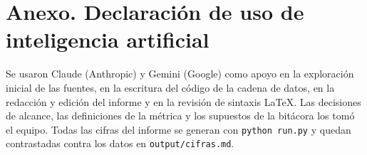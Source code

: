 
\section*{Anexo. Declaración de uso de inteligencia artificial}

Se usaron Claude (Anthropic) y Gemini (Google) como apoyo en la exploración inicial de las fuentes, en la escritura del código de la cadena de datos, en la redacción y edición del informe y en la revisión de sintaxis LaTeX. Las decisiones de alcance, las definiciones de la métrica y los supuestos de la bitácora los tomó el equipo. Todas las cifras del informe se generan con \texttt{python run.py} y quedan contrastadas contra los datos en \texttt{output/cifras.md}.
